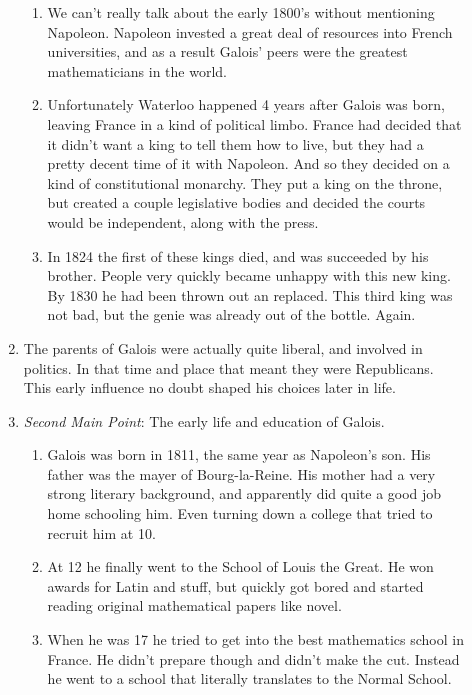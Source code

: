 \documentclass[letterpaper]{article}
\begin{document}
\begin{description}
\begin{enumerate}
  \begin{enumerate}
    \item
    We can't really talk about the early 1800's without mentioning Napoleon. Napoleon invested a great deal of resources into French universities, and as a result Galois' peers were the greatest mathematicians in the world. \cite{gods}
    \item
    Unfortunately Waterloo happened 4 years after Galois was born, leaving France in a kind of political limbo. France had decided that it didn't want a king to tell them how to live, but they had a pretty decent time of it with Napoleon. And so they decided on a kind of constitutional monarchy. They put a king on the throne, but created a couple legislative bodies and decided the courts would be independent, along with the press. \cite{france}
    \item
    In 1824 the first of these kings died, and was succeeded by his brother. People very quickly became unhappy with this new king. By 1830 he had been thrown out an replaced. This third king was not bad, but the genie was already out of the bottle. Again.
  \end{enumerate}
  \renewcommand{\labelenumi}{\emph{Transition}:}
  \item
  The parents of Galois were actually quite liberal, and involved in politics. In that time and place that meant they were Republicans. This early influence no doubt shaped his choices later in life.
  \renewcommand{\labelenumi}{\Roman{enumi}}
  \setcounter{enumi}{1}
  \item
  \emph{Second Main Point}: The early life and education of Galois.
  \begin{enumerate}
    \item
    Galois was born in 1811, the same year as Napoleon's son. \cite{gods} His father was the mayer of Bourg-la-Reine. His mother had a very strong literary background, and apparently did quite a good job home schooling him. Even turning down a college that tried to recruit him at 10.
    \item
    At 12 he finally went to the School of Louis the Great. He won awards for Latin and stuff, but quickly got bored and started reading original mathematical papers like novel.
    \item
    When he was 17 he tried to get into the best mathematics school in France. He didn't prepare though and didn't make the cut. Instead he went to a school that literally translates to the Normal School.
  \end{enumerate}

\end{enumerate}
\end{description}
\end{document}
